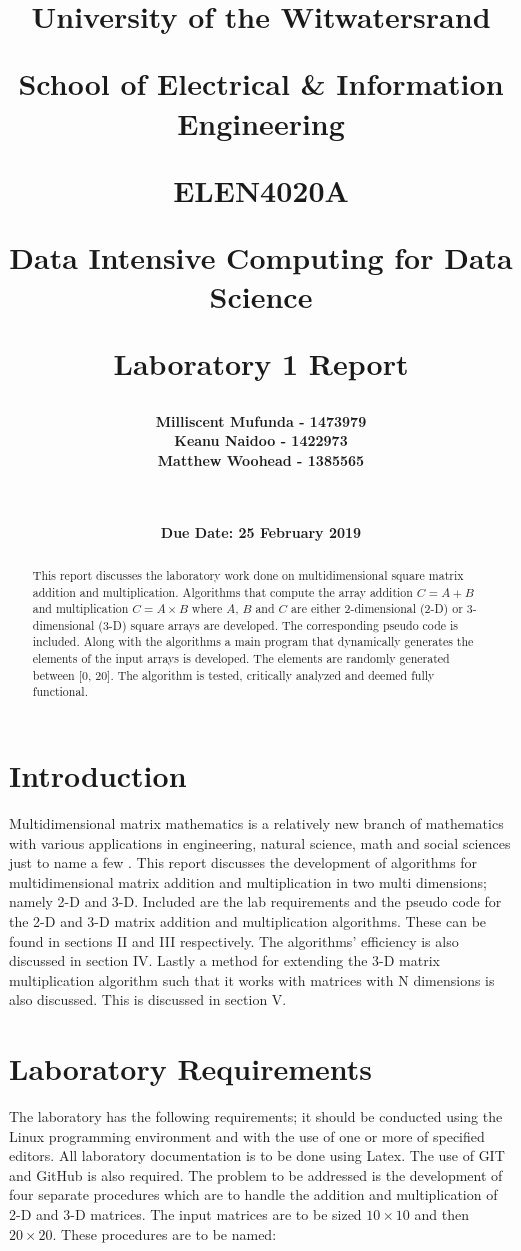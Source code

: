 \documentclass[twocolumn, 11pt]{IEEEtran}
\title{ \Large \bf University of the Witwatersrand \centerline{School of Electrical \& Information Engineering} \newline \newline \newline \newline \newline \newline \LARGE \bf ELEN4020A  \centerline{Data Intensive Computing for Data Science} \newline \centerline{Laboratory 1 Report} \newline}
\date{\LARGE \bf Due Date: 25 February 2019}
\author{ \LARGE \bf Milliscent Mufunda - 1473979 \\ \LARGE \bf Keanu Naidoo - 1422973 \\ \LARGE \bf Matthew Woohead -  1385565\\ \\ \\}
\begin{document}
\begin{titlingpage}

\maketitle

\end{titlingpage}

\setcounter{page}{1}

\begin{abstract}
    
This report discusses the laboratory work done on multidimensional square matrix addition and multiplication. Algorithms that compute the array addition $C = A + B$ and multiplication $C = A \times B$ where $A$, $B$ and $C$ are either 2-dimensional (2-D) or 3-dimensional (3-D) square arrays are developed. The corresponding pseudo code is included. Along with the algorithms a main program that dynamically generates the elements of the input arrays is developed. The elements are randomly generated between [0, 20]. The algorithm is tested, critically analyzed and deemed fully functional.
    
\end{abstract}

\section{Introduction}

Multidimensional matrix mathematics is a relatively new branch of mathematics with various applications in engineering, natural science, math and social sciences just to name a few \cite{c1}. This report discusses the development of algorithms for multidimensional matrix addition and multiplication in two multi dimensions; namely 2-D and 3-D. Included are the lab requirements and the pseudo code for the 2-D and 3-D matrix addition and multiplication algorithms. These can be found in sections II and III respectively. The algorithms' efficiency is also discussed in section IV. Lastly a method for extending the 3-D matrix multiplication algorithm such that it works with matrices with N dimensions is also discussed. This is discussed in section V. 


\section{Laboratory Requirements}

The laboratory has the following requirements; it should be conducted using the Linux programming environment and with the use of one or more of specified editors. All laboratory documentation is to be done using Latex. The use of GIT and GitHub is also required. The problem to be addressed is the development of four separate procedures which are to handle the addition and multiplication of 2-D and 3-D matrices. The input matrices are to be sized $10 \times 10$ and then $20 \times 20$. These procedures are to be named:  
\end{document}
